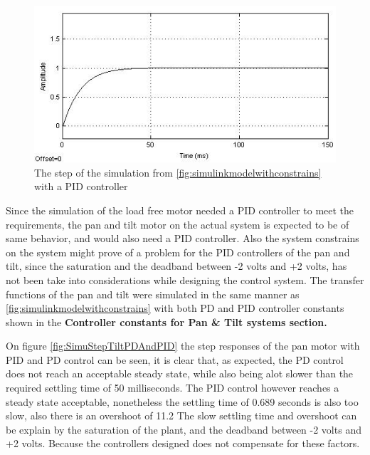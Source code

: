 \begin{figure}[h!]
\centering
\includegraphics[scale=0.7]{Billeder/SimuStepPIDWithConstrains.jpg}
\caption{ The step of the simulation from \ref{fig:simulinkmodelwithconstrains} with a PID controller }
\label{fig:SimuStepPIDWithConstrains}
\end{figure}

Since the simulation of the load free motor needed a PID controller to meet the requirements, the pan and tilt motor on the actual system is expected to be of same behavior, and would also need a PID controller. Also the system constrains on the system might prove of a problem for the PID controllers of the pan and tilt, since the saturation and the deadband between -2 volts and +2 volts, has not been take into considerations while designing the control system. The transfer functions of the pan and tilt were simulated in the same manner as \ref{fig:simulinkmodelwithconstrains} with both PD and PID controller constants shown in the \textbf{Controller constants for Pan \& Tilt systems section.}

On figure \ref{fig:SimuStepTiltPDAndPID} the step responses of the pan motor with PID and PD control can be seen, it is clear that, as expected, the PD control does not reach an acceptable steady state, while also being alot slower than the required settling time of 50 milliseconds. The PID control however reaches a steady state acceptable, nonetheless the settling time of 0.689 seconds is also too slow, also there is an overshoot of 11.2%
The slow settling time and overshoot can be explain by the saturation of the plant, and the deadband between -2 volts and +2 volts. Because the controllers designed does not compensate for these factors.   

